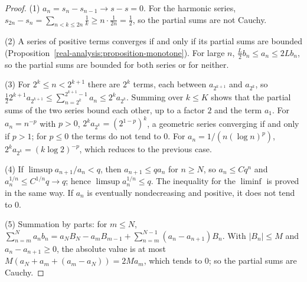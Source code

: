 \begin{proof}
(1) $a_n = s_n - s_{n-1} \to s - s = 0$. For the harmonic series, $s_{2n} - s_n = \sum_{n < k \leq 2n}\frac1k \geq n \cdot \frac1{2n} = \frac12$, so the partial sums are not Cauchy.

(2) A series of positive terms converges if and only if its partial sums are bounded (Proposition~\ref{real-analysis:proposition-monotone}). For large $n$, $\frac L2b_n \leq a_n \leq 2Lb_n$, so
the partial sums are bounded for both series or for neither.

(3) For $2^k \leq n < 2^{k+1}$ there are $2^k$ terms, each between $a_{2^{k+1}}$ and $a_{2^k}$, so
$\frac12 2^{k+1}a_{2^{k+1}} \leq \sum_{n = 2^k}^{2^{k+1} - 1}a_n \leq 2^ka_{2^k}$. Summing over $k \leq K$ shows that the partial sums of the two series bound each other, up to a factor
$2$ and the term $a_1$. For $a_n = n^{-p}$ with $p > 0$, $2^ka_{2^k} = (2^{1-p})^k$, a geometric series converging if and only if $p > 1$; for $p \leq 0$ the terms do not tend to $0$. For
$a_n = 1/(n(\log n)^p)$, $2^ka_{2^k} = (k\log 2)^{-p}$, which reduces to the previous case.

(4) If $\limsup a_{n+1}/a_n < q$, then $a_{n+1} \leq qa_n$ for $n \geq N$, so $a_n \leq Cq^n$ and $a_n^{1/n} \leq C^{1/n}q \to q$; hence $\limsup a_n^{1/n} \leq q$. The inequality for the $\liminf$
is proved in the same way. If $a_n$ is eventually nondecreasing and positive, it does not tend to $0$.

(5) Summation by parts: for $m \leq N$, $\sum_{n=m}^Na_nb_n = a_NB_N - a_mB_{m-1} + \sum_{n=m}^{N-1}(a_n - a_{n+1})B_n$. With $|B_n| \leq M$ and $a_n - a_{n+1} \geq 0$, the absolute value is
at most $M(a_N + a_m + (a_m - a_N)) = 2Ma_m$, which tends to $0$; so the partial sums are Cauchy.
\end{proof}

